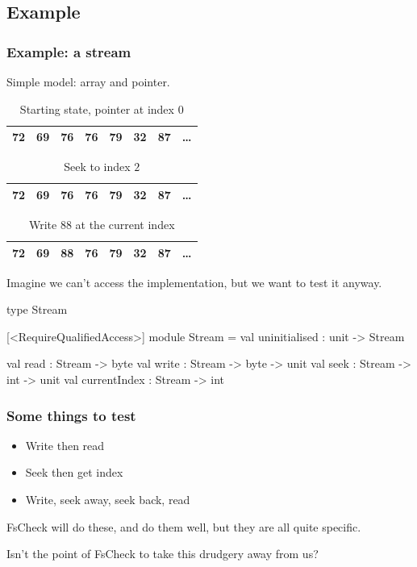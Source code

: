 \documentclass{beamer}
\begin{document}
\subsection{Example}
\begin{frame}[fragile]
\frametitle{Example: a stream}
Simple model: array and pointer.

\begin{table}
\captionsetup{labelformat=empty}
\caption{Starting state, pointer at index $0$}
\begin{tabular}{ |c|c|c|c|c|c|c|c }
    \hline
    \color{red}72 & 69 & 76 & 76 & 79 & 32 & 87 & \dots \\
    \hline
\end{tabular}
\end{table}

\begin{table}
\captionsetup{labelformat=empty}
\caption{Seek to index $2$}
\begin{tabular}{ |c|c|c|c|c|c|c|c }
    \hline
    72 & 69 & \color{red}76 & 76 & 79 & 32 & 87 & \dots \\
    \hline
\end{tabular}
\end{table}

\begin{table}
\captionsetup{labelformat=empty}
\caption{Write $88$ at the current index}
\begin{tabular}{ |c|c|c|c|c|c|c|c }
    \hline
    72 & 69 & \color{red}88 & 76 & 79 & 32 & 87 & \dots \\
    \hline
\end{tabular}
\end{table}

\end{frame}

\begin{frame}[fragile]
Imagine we can't access the implementation, but we want to test it anyway.

\begin{fslisting}
type Stream

[<RequireQualifiedAccess>]
module Stream =
    val uninitialised : unit -> Stream

    val read : Stream -> byte
    val write : Stream -> byte -> unit
    val seek : Stream -> int -> unit
    val currentIndex : Stream -> int
\end{fslisting}
\end{frame}

\begin{frame}
\frametitle{Some things to test}
\begin{itemize}
    \item Write then read
    \item Seek then get index
    \item Write, seek away, seek back, read
\end{itemize}

\hfill \break
FsCheck will do these, and do them well, but they are all quite specific.

Isn't the point of FsCheck to take this drudgery away from us?
\end{frame}
\end{document}
